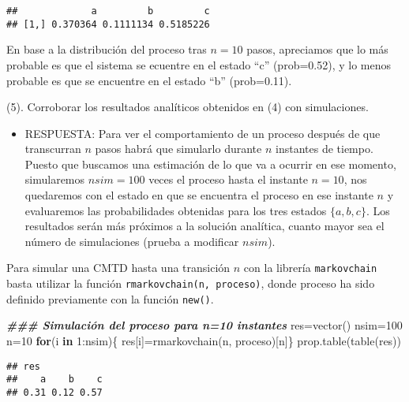 \documentclass[
]{book}
\newenvironment{Shaded}{\begin{snugshade}}{\end{snugshade}}
\newcommand{\ControlFlowTok}[1]{\textcolor[rgb]{0.13,0.29,0.53}{\textbf{#1}}}
\newcommand{\DecValTok}[1]{\textcolor[rgb]{0.00,0.00,0.81}{#1}}
\newcommand{\DocumentationTok}[1]{\textcolor[rgb]{0.56,0.35,0.01}{\textbf{\textit{#1}}}}
\newcommand{\FunctionTok}[1]{\textcolor[rgb]{0.00,0.00,0.00}{#1}}
\newcommand{\NormalTok}[1]{#1}
\newcommand{\OtherTok}[1]{\textcolor[rgb]{0.56,0.35,0.01}{#1}}
\newcommand{\SpecialCharTok}[1]{\textcolor[rgb]{0.00,0.00,0.00}{#1}}
\providecommand{\tightlist}{%
  \setlength{\itemsep}{0pt}\setlength{\parskip}{0pt}}
\newenvironment{whitebox}{
  \definecolor{shadecolor}{rgb}{255, 255, 255}  
  \color{black}
  \begin{shaded}}
 {\end{shaded}}
\theoremstyle{definition}
\theoremstyle{definition}
\theoremstyle{definition}
\theoremstyle{definition}
\theoremstyle{remark}
\begin{document}
\begin{verbatim}
##             a         b         c
## [1,] 0.370364 0.1111134 0.5185226
\end{verbatim}

En base a la distribución del proceso tras \(n=10\) pasos, apreciamos que lo más probable es que el sistema se ecuentre en el estado ``c'' (prob=0.52), y lo menos probable es que se encuentre en el estado ``b'' (prob=0.11).

(5). Corroborar los resultados analíticos obtenidos en (4) con simulaciones.

\begin{itemize}
\tightlist
\item
  RESPUESTA: Para ver el comportamiento de un proceso después de que transcurran \(n\) pasos habrá que simularlo durante \(n\) instantes de tiempo. Puesto que buscamos una estimación de lo que va a ocurrir en ese momento, simularemos \(nsim=100\) veces el proceso hasta el instante \(n=10\), nos quedaremos con el estado en que se encuentra el proceso en ese instante \(n\) y evaluaremos las probabilidades obtenidas para los tres estados \(\{a,b,c\}\). Los resultados serán más próximos a la solución analítica, cuanto mayor sea el número de simulaciones (prueba a modificar \(nsim\)).
\end{itemize}

\begin{whitebox}
Para simular una CMTD hasta una transición \(n\) con la librería \texttt{markovchain} basta utilizar la función \texttt{rmarkovchain(n,\ proceso)}, donde proceso ha sido definido previamente con la función \texttt{new()}.

\end{whitebox}

\begin{Shaded}
\begin{Highlighting}[]
\DocumentationTok{\#\#\# Simulación del proceso para n=10 instantes }
\NormalTok{res}\OtherTok{=}\FunctionTok{vector}\NormalTok{()}
\NormalTok{nsim}\OtherTok{=}\DecValTok{100}
\NormalTok{n}\OtherTok{=}\DecValTok{10}
\ControlFlowTok{for}\NormalTok{(i }\ControlFlowTok{in} \DecValTok{1}\SpecialCharTok{:}\NormalTok{nsim)\{}
\NormalTok{  res[i]}\OtherTok{=}\FunctionTok{rmarkovchain}\NormalTok{(n, proceso)[n]\}}
\FunctionTok{prop.table}\NormalTok{(}\FunctionTok{table}\NormalTok{(res))}
\end{Highlighting}
\end{Shaded}

\begin{verbatim}
## res
##    a    b    c 
## 0.31 0.12 0.57
\end{verbatim}
\end{document}
